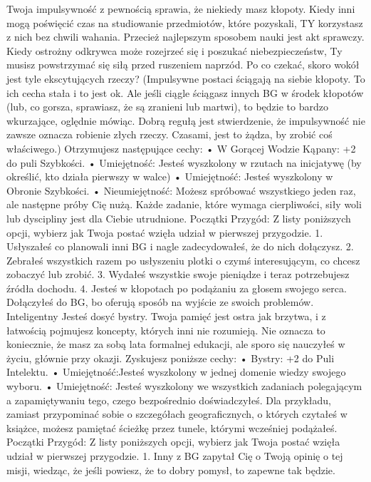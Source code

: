 Twoja impulsywność z pewnością sprawia, że niekiedy masz kłopoty. Kiedy inni mogą poświęcić czas na studiowanie przedmiotów, które pozyskali, TY korzystasz z nich bez chwili wahania. Przecież najlepszym sposobem nauki jest akt sprawczy. Kiedy ostrożny odkrywca może rozejrzeć się i poszukać niebezpieczeństw, Ty musisz powstrzymać się siłą przed ruszeniem naprzód. Po co czekać, skoro wokół jest tyle ekscytujących rzeczy?
(Impulsywne postaci ściągają na siebie kłopoty. To ich cecha stała i to jest ok. Ale jeśli ciągle ściągasz innych BG w środek kłopotów (lub, co gorsza, sprawiasz, że są zranieni lub martwi), to będzie to bardzo wkurzające, oględnie mówiąc. Dobrą regułą jest stwierdzenie, że impulsywność nie zawsze oznacza robienie złych rzeczy. Czasami, jest to żądza, by zrobić coś właściwego.)
Otrzymujesz następujące cechy:
    • W Gorącej Wodzie Kąpany: +2 do puli Szybkości.
    • Umiejętność: Jesteś wyszkolony w rzutach na inicjatywę (by określić, kto działa pierwszy w walce)
    • Umiejętność: Jesteś wyszkolony w Obronie Szybkości.
    • Nieumiejętność: Możesz spróbować wszystkiego jeden raz, ale następne próby Cię nużą. Każde zadanie, które wymaga cierpliwości, siły woli lub dyscipliny jest dla Ciebie utrudnione. 
Początki Przygód: Z listy poniższych opcji, wybierz jak Twoja postać wzięła udział w pierwszej przygodzie.
1. Usłyszałeś co planowali inni BG i nagle zadecydowałeś, że do nich dołączysz.
2. Zebrałeś wszystkich razem po usłyszeniu plotki o czymś interesującym, co chcesz zobaczyć lub zrobić.
3. Wydałeś wszystkie swoje pieniądze i teraz potrzebujesz źródła dochodu.
4. Jesteś w kłopotach po podążaniu za głosem swojego serca. Dołączyłeś do BG, bo oferują sposób na wyjście ze swoich problemów.
Inteligentny
Jesteś dosyć bystry. Twoja pamięć jest ostra jak brzytwa, i z łatwością pojmujesz koncepty, których inni nie rozumieją. Nie oznacza to koniecznie, że masz za sobą lata formalnej edukacji, ale sporo się nauczyłeś w życiu, głównie przy okazji.
Zyskujesz poniższe cechy:
    • Bystry: +2 do Puli Intelektu.
    • Umiejętność:Jesteś wyszkolony w jednej domenie wiedzy swojego wyboru.
    • Umiejętność: Jesteś wyszkolony we wszystkich zadaniach polegającym a zapamiętywaniu tego, czego bezpośrednio doświadczyłeś. Dla przykładu, zamiast przypominać sobie o szczegółach geograficznych, o których czytałeś w książce, możesz pamiętać ścieżkę przez tunele, którymi wcześniej podążałeś.
Początki Przygód: Z listy poniższych opcji, wybierz jak Twoja postać wzięła udział w pierwszej przygodzie.
1. Inny z BG zapytał Cię o Twoją opinię o tej misji, wiedząc, że jeśli powiesz, że to dobry pomysł, to zapewne tak będzie.

